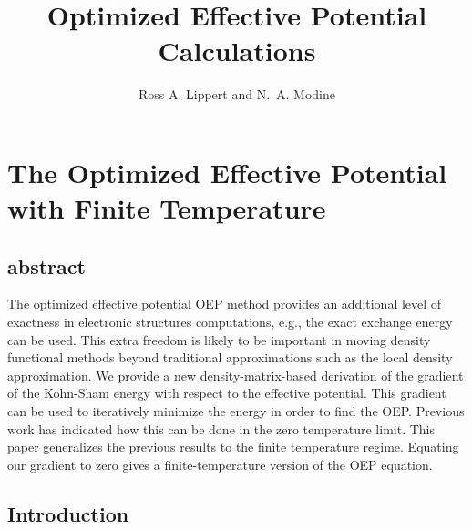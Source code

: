 \documentclass{article}
\title{{\bf Optimized Effective Potential Calculations}}
\author{Ross A. Lippert and N.~A. Modine}
\begin{document}
\maketitle

\section{The Optimized Effective Potential with Finite Temperature}

\subsection{abstract}
The optimized effective potential OEP method provides an additional level
of exactness in electronic structures computations, e.g., the exact
exchange energy can be used.  This extra freedom is likely to be
important in moving density functional methods beyond traditional
approximations such as the local density approximation.  We provide
a new density-matrix-based derivation of the gradient of the Kohn-Sham
energy with respect to the effective potential.  This gradient can be
used to iteratively minimize the energy in order to find the OEP.
Previous work has indicated how this can be done in the zero temperature
limit.  This paper generalizes the previous results to the finite
temperature regime.  Equating our gradient to zero gives a finite-temperature
version of the OEP equation.

\subsection{Introduction}
\end{document}
